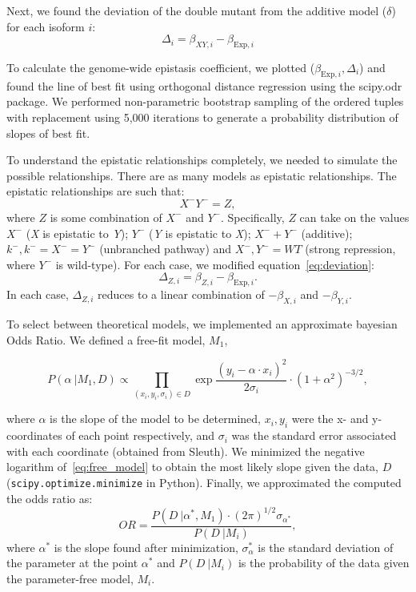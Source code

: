 \documentclass[9pt,twocolumn,twoside]{pnas-new}
\newcommand{\gene}[1]{\emph{#1}}
\begin{document}
{Next, we found the deviation of the double mutant from the additive model ($\delta$)
for each isoform $i$:
\begin{equation}
  \Delta_i = \beta_{XY,i} - \beta_{\mathrm{Exp},i}
  \label{eq:deviation}
\end{equation}

To calculate the genome-wide epistasis coefficient, we plotted
($\beta_{\mathrm{Exp},i}, \Delta_i$) and found the line of best fit using
orthogonal distance regression using the scipy.odr package. We performed
non-parametric bootstrap sampling of the ordered tuples with replacement using
5,000 iterations to generate a probability distribution of slopes of best fit.

To understand the epistatic relationships completely, we needed to simulate the
possible relationships.
There are as many models as epistatic relationships. The epistatic relationships
are such that:
\begin{equation}
  X^-Y^- = Z,
\end{equation}
where $Z$ is some combination of $X^-$ and $Y^-$. Specifically, $Z$ can take on
the values $X^-$ (\gene{X} is epistatic to \gene{Y}); $Y^-$ (\gene{Y} is epistatic
to \gene{X});
$X^- + Y^-$ (additive); $k^-, k^-=X^-=Y^-$ (unbranched pathway) and
$X^-, Y^-=WT$ (strong repression, where $Y^-$ is wild-type).
For each case, we modified equation~\ref{eq:deviation}:
\begin{equation}
  \Delta_{Z,i} = \beta_{Z,i} - \beta_{\mathrm{Exp},i}.
\end{equation}
In each case, $\Delta_{Z,i}$ reduces to a linear combination of $-\beta_{X,i}$
and $-\beta_{Y,i}$.

To select between theoretical models, we implemented an approximate bayesian
Odds Ratio. We defined a free-fit model, $M_1$,

\begin{equation}
  P(\alpha~|M_1, D) \propto \prod_{(x_i, y_i, \sigma_i)\in D}
  \exp{\frac{(y_i - \alpha\cdot x_i)^2}{2\sigma_i}}\cdot (1+\alpha^2)^{-3/2},
  \label{eq:free_model}
\end{equation}

where $\alpha$ is the slope of the model to be determined, $x_i, y_i$ were the
x- and y-coordinates of each point respectively, and $\sigma_i$ was the standard
error associated with each coordinate (obtained from Sleuth). We minimized the
negative logarithm of~\ref{eq:free_model} to obtain the most likely slope given
the data, $D$ (\texttt{scipy.optimize.minimize} in Python). Finally, we
approximated the computed the odds ratio as:
\begin{equation}
  OR = \frac{
  P(D~|\alpha^*, M_1)\cdot (2\pi)^{1/2}\sigma_{\alpha^*}
  }{P(D~| M_i)},
\end{equation}
where $\alpha^*$ is the slope found after minimization, $\sigma_\alpha^*$ is the
standard deviation of the parameter at the point $\alpha^*$ and $P(D~|M_i)$ is the
probability of the data given the parameter-free model, $M_i$.

}
\end{document}
